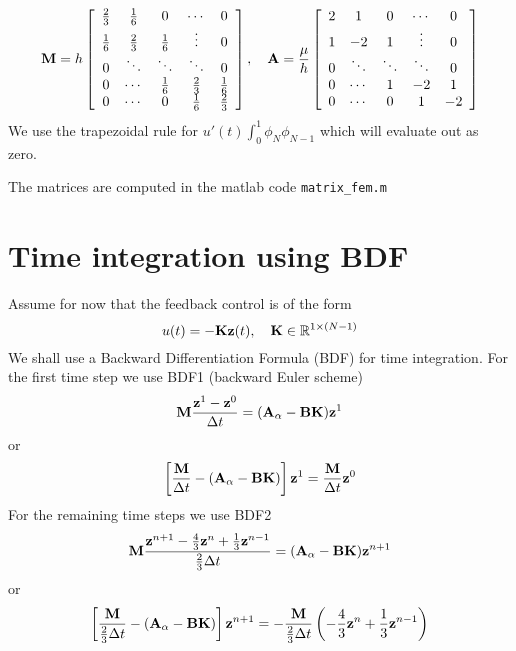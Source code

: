 \documentclass[12pt]{article}
\begin{document}
\[
 {\mathbf M} = h \left[\begin{array}{ccccc}
         \frac{2}{3} & \frac{1}{6} & 0 & \cdots & 0 \\
         \frac{1}{6} & \frac{2}{3} & \frac{1}{6}  & \vdots & 0 \\
         0 & \ddots  & \ddots & \ddots & 0 \\
         0 & \cdots & \frac{1}{6} & \frac{2}{3} & \frac{1}{6} \\
         0 & \cdots & 0 & \frac{1}{6} & \frac{2}{3}
        \end{array} \right] , \quad
 {\mathbf A} = \frac{\mu}{h} \left[\begin{array}{ccccc}
         \-2 & 1 & 0 & \cdots & 0 \\
         1 & -2 & 1  & \vdots & 0 \\
         0 & \ddots  & \ddots & \ddots & 0 \\
         0 & \cdots & 1 & -2 & 1 \\
         0 & \cdots & 0 & 1 & -2
        \end{array} \right]       
\]
We use the trapezoidal rule for $u'(t) \int_0^1 \phi_N \phi_{N-1}$ which will evaluate out as zero. 

\vspace{2mm}

\noindent
The matrices are computed in the matlab code {\tt matrix\_fem.m}
\section{Time integration using BDF}
Assume for now that the feedback control is of the form 
\[
 u(t) = - {\mathbf K} {\mathbf z}(t), \quad {\mathbf K} \in \mathbb{R}^{1\times(N-1)}
\]
We shall use a Backward Differentiation Formula (BDF) for time integration. For the first time step we use BDF1 (backward Euler scheme)
\[
 {\mathbf M} \frac{{\mathbf z}^1 - {\mathbf z}^0}{\Delta t} = ({\mathbf A}_\alpha - {\mathbf B} {\mathbf K}){\mathbf z}^1
\]
or
\[
 \left[ \frac{{\mathbf M} }{\Delta t} - ({\mathbf A}_\alpha - {\mathbf B} {\mathbf K}) \right] {\mathbf z}^1 =  \frac{{\mathbf M}}{\Delta t} {\mathbf z}^0 
\]
For the remaining time steps we use BDF2
\[
 {\mathbf M} \frac{{\mathbf z}^{n+1} - \frac{4}{3} {\mathbf z}^{n} + \frac{1}{3} {\mathbf z}^{n-1}}{\frac{2}{3}\Delta t} = ({\mathbf A}_\alpha - {\mathbf B} {\mathbf K}){\mathbf z}^{n+1}
\]
or
\[
 \left[ \frac{{\mathbf M} }{\frac{2}{3}\Delta t} - ({\mathbf A}_\alpha - {\mathbf B} {\mathbf K}) \right] {\mathbf z}^{n+1} =  -\frac{{\mathbf M}}{\frac{2}{3}\Delta t}\left( -\frac{4}{3} {\mathbf z}^{n} + \frac{1}{3} {\mathbf z}^{n-1} \right)
\]

\end{document}

